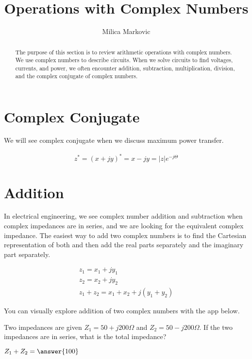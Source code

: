 \documentclass{ximera}
\title{Operations with Complex Numbers}
\author{Milica Markovic}
\begin{document}
  
\begin{abstract}  
The purpose of this section is to review arithmetic operations with complex numbers. We use complex numbers to describe circuits. When we solve circuits to find voltages, currents, and power, we often encounter addition, subtraction, multiplication, division, and the complex conjugate of complex numbers.  
\end{abstract}  
\maketitle    
  
  

\section{Complex Conjugate}

 We will see complex conjugate when we discuss maximum power transfer.

\begin{eqnarray}
z^* = (x+ j y)^* = x- j y = |z| e^{-j \Theta}
\end{eqnarray}


\section{Addition}



 In electrical engineering, we see complex number addition and subtraction when complex impedances are in series, and we are looking for the equivalent complex impedance. The easiest way to add two complex numbers is to find the Cartesian representation of both and then add the real parts separately and the imaginary part separately.

\begin{eqnarray}
z_1=x_1 + j y_1 \nonumber \\
z_2=x_2 + j y_2 \nonumber \\
z_1+z_2 = x_1 + x_2 + j ( y_1 + y_2)
\end{eqnarray}


You can visually explore addition of two complex numbers with the app below.
\begin{center}  
\end{center} 



\begin{question}
Two impedances are given $Z_1=50+j200 \Omega$ and  $Z_2=50-j200 \Omega$. If the two impedances are in series, what is the total impedance?
  
$Z_1+Z_2 = \answer{100}$  
\end{question} 
\end{document}
